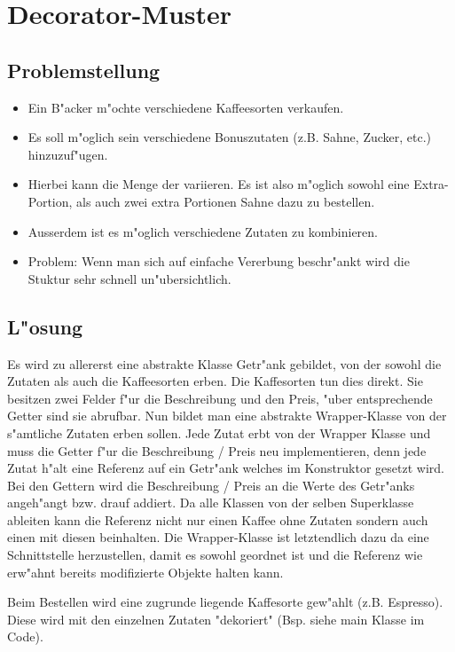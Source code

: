 \section{Decorator-Muster}

\subsection{Problemstellung}
\begin{itemize}
\item Ein B"acker m"ochte verschiedene Kaffeesorten verkaufen. 
\item Es soll m"oglich sein verschiedene Bonuszutaten (z.B. Sahne, Zucker, etc.) hinzuzuf"ugen. 
\item Hierbei kann die Menge der variieren. Es ist also m"oglich sowohl eine Extra-Portion, als auch 
  zwei extra Portionen Sahne dazu zu bestellen. 
\item Ausserdem ist es m"oglich verschiedene Zutaten zu kombinieren. 
\item Problem: Wenn man sich auf einfache Vererbung beschr"ankt wird die Stuktur sehr schnell 
  un"ubersichtlich. 
\end{itemize}

\subsection{L"osung}
Es wird zu allererst eine abstrakte Klasse Getr"ank gebildet, von der sowohl die Zutaten als auch 
die Kaffeesorten erben. Die Kaffesorten tun dies direkt. Sie besitzen zwei Felder f"ur die 
Beschreibung und den Preis, "uber entsprechende Getter sind sie abrufbar. Nun bildet man eine 
abstrakte Wrapper-Klasse von der s"amtliche Zutaten erben sollen. Jede Zutat erbt von der Wrapper 
Klasse und muss die Getter f"ur die Beschreibung / Preis neu implementieren, denn jede Zutat 
h"alt eine Referenz auf ein Getr"ank welches im Konstruktor gesetzt wird. Bei den Gettern wird 
die Beschreibung / Preis an die Werte des Getr"anks angeh"angt bzw. drauf addiert. Da alle 
Klassen von der selben Superklasse ableiten kann die Referenz nicht nur einen Kaffee ohne Zutaten 
sondern auch einen mit diesen beinhalten. Die Wrapper-Klasse ist letztendlich dazu da eine 
Schnittstelle herzustellen, damit es sowohl geordnet ist und die Referenz wie erw"ahnt 
bereits modifizierte Objekte halten kann. 

Beim Bestellen wird eine zugrunde liegende Kaffesorte gew"ahlt (z.B. Espresso). Diese wird mit 
den einzelnen Zutaten "dekoriert" (Bsp. siehe main Klasse im Code). 

